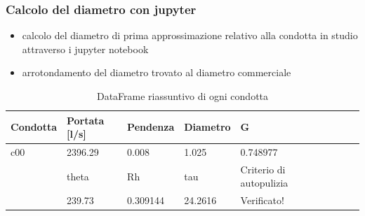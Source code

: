 \documentclass{beamer}
\begin{document}
\begin{frame}
 \frametitle{Calcolo del diametro con jupyter}
    \begin{itemize}
     \item calcolo del diametro di prima approssimazione relativo alla condotta in studio attraverso i jupyter notebook
     \item arrotondamento del diametro trovato al diametro commerciale
    \end{itemize}
 
 \scriptsize
   \begin{table}
   \caption{DataFrame riassuntivo di ogni condotta}
    \begin{tabular}{lllllllll}
        \toprule
        Condotta & Portata [l/s] & Pendenza & Diametro &         G\\
        \midrule
        c00      &       2396.29 &    0.008 &    1.025 &  0.748977\\
        \bottomrule
         &   theta &        Rh &      tau & Criterio di autopulizia \\
         \midrule
          &  239.73 &  0.309144 &  24.2616 &                        Verificato! \\
        \bottomrule
    \end{tabular}    
   \end{table}
\end{frame}
\end{document}
